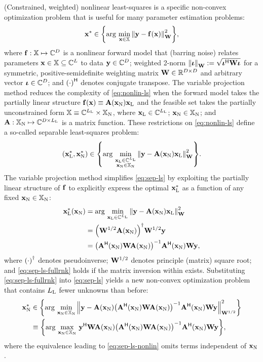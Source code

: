 (Constrained, weighted) nonlinear least-squares
is a specific non-convex optimization problem 
that is useful for many parameter estimation problems:
\begin{align}
	\bmx^* \in \set{\argmin{\bmx\in\setX} \norm{\bmy - \bmfa{\bmx}}^2_{\bmW}},
	\label{eq:nonlin-ls}
\end{align}
where $\mathbf{f} : \mathbb{X} \mapsto \mathbb{C}^{D}$ is 
a nonlinear forward model
that (barring noise) 
relates parameters 
$\mathbf{x} \in \mathbb{X} \subseteq \mathbb{C}^{L}$ 
to data $\mathbf{y} \in \mathbb{C}^{D}$;
weighted 2-norm
$\norm{\bmiota}_\bmW := \sqrt{\bmiota\ctpose\bmW\bmiota}$
for a symmetric, positive-semidefinite weighting matrix
$\mathbf{W} \in \mathbb{R}^{D\times D}$ 
and arbitrary vector $\boldsymbol{\iota} \in \mathbb{C}^{D}$;
and $\paren{\cdot}\ctpose$ denotes conjugate transpose.
The variable projection method 
\cite{golub:03:snl}
reduces the complexity of \eqref{eq:nonlin-ls}
when the forward model takes
the partially linear structure
$\bmfa{\bmx} \equiv \bmAa{\bmxn}\bmxl$
and the feasible set takes 
the partially unconstrained form 
$\mathbb{X} \equiv \mathbb{C}^{L_\mathrm{L}} \times \mathbb{X}_\mathrm{N}$,
where $\mathbf{x}_\mathrm{L} \in \mathbb{C}^{L_\mathrm{L}}$; $\mathbf{x}_\mathrm{N} \in \mathbb{X}_\mathrm{N}$;
and $\mathbf{A} : \mathbb{X}_\mathrm{N} \mapsto \mathbb{C}^{D\times L_\mathrm{L}}$ 
is a matrix function.
These restrictions on \eqref{eq:nonlin-ls} 
define a so-called separable least-squares problem:
\begin{align}
	\paren{\bmxl^*,\bmxn^*} \in 
		\set{\argmin{\substack{\bmxl \in \complexes{\Ll} \\ \bmxn \in \setXn}} 
		\norm{\bmy - \bmAa{\bmxn}\bmxl}^2_{\bmW}}.
	\label{eq:sep-ls}
\end{align}
The variable projection method simplifies \eqref{eq:sep-ls}
by exploiting the partially linear structure of $\mathbf{f}$ 
to explicitly express the optimal $\mathbf{x}_\mathrm{L}^*$ as a function 
of any fixed $\mathbf{x}_\mathrm{N} \in \mathbb{X}_\mathrm{N}$:
\begin{align}
	\bmxl^*\paren{\bmxn} 
		&= \argmin{\bmxl \in \complexes{\Ll}} 
		\norm{\bmy - \bmAa{\bmxn}\bmxl}^2_{\bmW} 
		\nonumber \\
		&= \pinv{\bmW^{1/2}\bmAa{\bmxn}} \bmW^{1/2} \bmy
		\label{eq:sep-ls-lin} \\
		&= \inv{\bmA\ctpose\paren{\bmxn} \bmW \bmAa{\bmxn}} 
		\bmA\ctpose\paren{\bmxn} \bmW \bmy,
		\label{eq:sep-ls-fullrnk}
\end{align}
where $\pinv{\cdot}$ denotes pseudoinverse;
$\mathbf{W}^{1/2}$ denotes principle (matrix) square root;
and \eqref{eq:sep-ls-fullrnk} holds
if the matrix inversion within exists.
Substituting \eqref{eq:sep-ls-fullrnk}
into \eqref{eq:sep-ls} 
yields a new non-convex optimization problem
that contains $L_\mathrm{L}$ fewer unknowns than before:
\begin{align}
	\bmxn^* &\in \set{\argmin{\bmxn\in\setXn} 
	\norm{\bmy - \bmAa{\bmxn}\inv{\bmA\ctpose\paren{\bmxn} \bmW \bmAa{\bmxn}}
		\bmA\ctpose\paren{\bmxn} \bmW \bmy}^2_{\bmW^{1/2}}} 
		\nonumber \\
	&\equiv \set{\argmax{\bmxn\in\setXn}
		\bmy\ctpose \bmW \bmAa{\bmxn}
		\inv{\bmA\ctpose\paren{\bmxn} \bmW \bmAa{\bmxn}}
		\bmA\ctpose\paren{\bmxn} \bmW \bmy}, 
		\label{eq:sep-ls-nonlin}
\end{align}
where the equivalence leading to \eqref{eq:sep-ls-nonlin}
omits terms independent of $\mathbf{x}_\mathrm{N}$.

